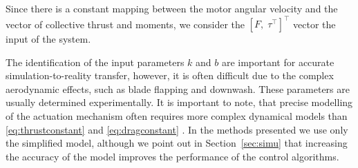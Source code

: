 
Since there is a constant mapping between the motor angular velocity and the vector of collective thrust and moments, we consider the $\left[F,\; \tau^\top\right]^\top$ vector the input of the system.

The identification of the input parameters $k$ and $b$ are important for accurate simulation-to-reality transfer, however, it is often difficult due to the complex aerodynamic effects, such as blade flapping and downwash. These parameters are usually determined experimentally. It is important to note, that precise modelling of the actuation mechanism often requires more complex dynamical models than \eqref{eq:thrustconstant} and \eqref{eq:dragconstant} \cite{Forster}.  In the methods presented we use only the simplified model, although we point out in Section~\ref{sec:simu} that increasing the accuracy of the model improves the performance of the control algorithms.
